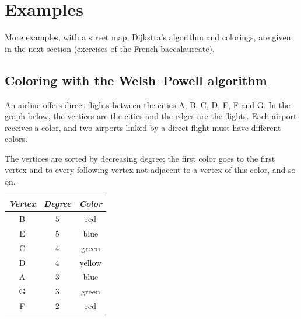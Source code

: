 \section{Examples}
More examples, with a street map, Dijkstra's algorithm and colorings, are
given in the next section (exercises of the French baccalaureate).

\subsection{Coloring with the Welsh--Powell algorithm}\label{sec:welsh}
An airline offers direct flights between the cities A, B, C, D, E, F and G.
In the graph below, the vertices are the cities and the edges are the
flights. Each airport receives a color, and two airports linked by a direct
flight must have different colors.

The vertices are sorted by decreasing degree; the first color goes to the
first vertex and to every following vertex not adjacent to a vertex of this
color, and so on.

\medskip
\begin{minipage}{7cm}
\end{minipage}
\hfill
\begin{minipage}{7cm}
\begin{tabular}{ccc}
\toprule
\itshape Vertex & \itshape Degree & \itshape Color\\
\midrule
B & $5$ & red\\
E & $5$ & blue\\
C & $4$ & green\\
D & $4$ & yellow\\
A & $3$ & blue\\
G & $3$ & green\\
F & $2$ & red\\
\bottomrule
\end{tabular}
\end{minipage}

\medskip
\begin{tkzexample}[latex=7cm,small]
\end{tkzexample}

